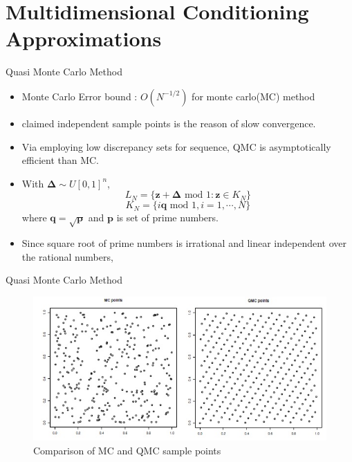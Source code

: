 \section{Multidimensional Conditioning Approximations}\label{sec:MCA}


\begin{frame}{Quasi Monte Carlo Method}
\begin{itemize}
	\item Monte Carlo Error bound : $O(N^{-1/2})$ for monte carlo(MC) method
	\item \citet{genz2009computation} claimed independent sample points is the reason of slow convergence.
	\item Via employing low discrepancy sets for sequence, QMC is asymptotically efficient than MC.
	\item With $\boldsymbol{\Delta}\sim U[0,1]^n$,
	$$L_N=\{\mathbf{z}+\boldsymbol{\Delta}\text{ mod }1:\mathbf{z}\in K_N\}$$
	$$K_N=\{i\mathbf{q}\text{ mod }1,i=1,\cdots,N\}$$
	where $\mathbf{q}=\sqrt{\mathbf{p}}$ and $\mathbf{p}$ is set of prime numbers.
	\item Since square root of prime numbers is irrational and linear independent over the rational numbers, 
\end{itemize}
\end{frame}

\begin{frame}{Quasi Monte Carlo Method}
\begin{figure}[ht]
	\centering
	\includegraphics[width=\linewidth]{figs/QMC.jpg}
	\caption{Comparison of MC and QMC sample points\citep{genz2009computation}}
	\label{fig:QMC}
\end{figure}
\end{frame}

